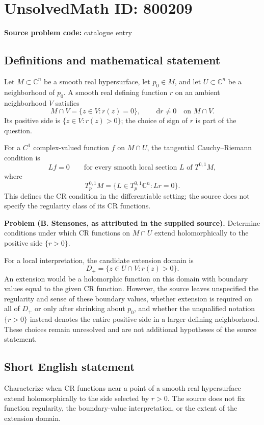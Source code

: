 \documentclass[11pt]{article}
\newcommand{\C}{\mathbb{C}}
\newcommand{\dd}{\,\mathrm{d}}
\begin{document}
\section*{UnsolvedMath ID: 800209}
\textbf{Source problem code:} catalogue entry
\subsection{Definitions and mathematical statement}
Let \(M\subset\C^n\) be a smooth real hypersurface, let \(p_0\in M\), and let \(U\subset\C^n\) be a neighborhood of \(p_0\). A smooth real defining function \(r\) on an ambient neighborhood \(V\) satisfies
\[
M\cap V=\{z\in V:r(z)=0\},\qquad \dd r\ne0\quad\text{on }M\cap V.
\]
Its positive side is \(\{z\in V:r(z)>0\}\); the choice of sign of \(r\) is part of the question.

For a \(C^1\) complex-valued function \(f\) on \(M\cap U\), the tangential Cauchy--Riemann condition is
\[
Lf=0\qquad\text{for every smooth local section }L\text{ of }T^{0,1}M,
\]
where
\[
T_p^{0,1}M=\{L\in T_p^{0,1}\C^n:Lr=0\}.
\]
This defines the CR condition in the differentiable setting; the source does not specify the regularity class of its CR functions.

\textbf{Problem (B. Stensones, as attributed in the supplied source).} Determine conditions under which CR functions on \(M\cap U\) extend holomorphically to the positive side \(\{r>0\}\).

For a local interpretation, the candidate extension domain is
\[
D_+=\{z\in U\cap V:r(z)>0\}.
\]
An extension would be a holomorphic function on this domain with boundary values equal to the given CR function. However, the source leaves unspecified the regularity and sense of these boundary values, whether extension is required on all of \(D_+\) or only after shrinking about \(p_0\), and whether the unqualified notation \(\{r>0\}\) instead denotes the entire positive side in a larger defining neighborhood. These choices remain unresolved and are not additional hypotheses of the source statement.
\subsection{Short English statement}
Characterize when CR functions near a point of a smooth real hypersurface extend holomorphically to the side selected by \(r>0\). The source does not fix function regularity, the boundary-value interpretation, or the extent of the extension domain.
\end{document}
